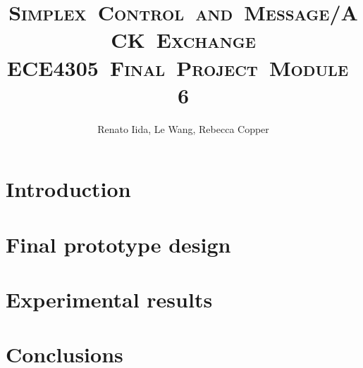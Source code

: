 \documentclass[11pt]{mvlthesis}
\title{\scshape \mbox{Simplex Control and Message/ACK Exchange}\\
\scshape \mbox{ECE4305 Final Project Module 6}}
\author{Renato Iida, Le Wang, Rebecca Copper}
\begin{document}
\maketitle
\begin{abstract}



\end{abstract}


\begin{frontmatter}


\tableofcontents
\listoffigures
\listoftables

\end{frontmatter}



\chapter{Introduction}
\label{ch:introduction}





\chapter{Final prototype design}
\label{ch:design}


\chapter{Experimental results}
\label{ch:results}



\chapter{Conclusions}
\label{ch:conclusions}







\end{document}
